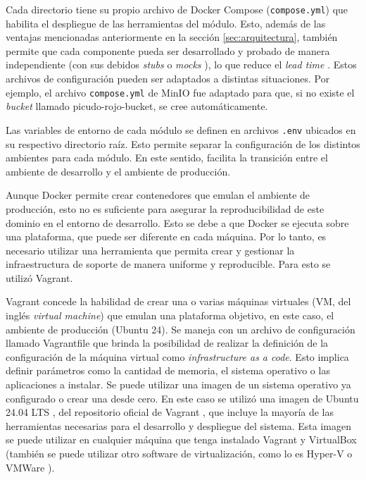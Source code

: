 Cada directorio tiene su propio archivo de Docker Compose (\texttt{compose.yml}) que habilita el despliegue de las herramientas del módulo. Esto, además de las ventajas mencionadas anteriormente en la sección \ref{sec:arquitectura}, también permite que cada componente pueda ser desarrollado y probado de manera independiente (con sus debidos \textit{stubs} \citep{wikipedia_talon_2025} o \textit{mocks} \citep{wikipedia_objeto_2024}), lo que reduce el \textit{lead time} \citep{wikipedia_lead_2025}. Estos archivos de configuración pueden ser adaptados a distintas situaciones. Por ejemplo, el archivo \texttt{compose.yml} de MinIO fue adaptado para que, si no existe el \textit{bucket} llamado picudo-rojo-bucket, se cree automáticamente.

Las variables de entorno de cada módulo se definen en archivos \texttt{.env} ubicados en su respectivo directorio raíz. Esto permite separar la configuración de los distintos ambientes para cada módulo. En este sentido, facilita la transición entre el ambiente de desarrollo y el ambiente de producción.

Aunque Docker permite crear contenedores que emulan el ambiente de producción, esto no es suficiente para asegurar la reproducibilidad de este dominio en el entorno de desarrollo. Esto se debe a que Docker se ejecuta sobre una plataforma, que puede ser diferente en cada máquina. Por lo tanto, es necesario utilizar una herramienta que permita crear y gestionar la infraestructura de soporte de manera uniforme y reproducible. Para esto se utilizó Vagrant.

Vagrant concede la habilidad de crear una o varias máquinas virtuales (VM, del inglés \textit{virtual machine}) que emulan una plataforma objetivo, en este caso, el ambiente de producción (Ubuntu 24). Se maneja con un archivo de configuración llamado Vagrantfile que brinda la posibilidad de realizar la definición de la configuración de la máquina virtual como \textit{infrastructure as a code}. Esto implica definir parámetros como la cantidad de memoria, el sistema operativo o las aplicaciones a instalar. Se puede utilizar una imagen de un sistema operativo ya configurado o crear una desde cero. En este caso se utilizó una imagen de Ubuntu 24.04 LTS \citep{bento_project_ubuntu_nodate}, del repositorio oficial de Vagrant \citep{hashicorp_hashicorp_nodate}, que incluye la mayoría de las herramientas necesarias para el desarrollo y despliegue del sistema. Esta imagen se puede utilizar en cualquier máquina que tenga instalado Vagrant y VirtualBox \citep{wikipedia_virtualbox_2025} (también se puede utilizar otro software de virtualización, como lo es Hyper-V \citep{microsoft_informacion_2025} o VMWare \citep{wikipedia_vmware_2025}).

